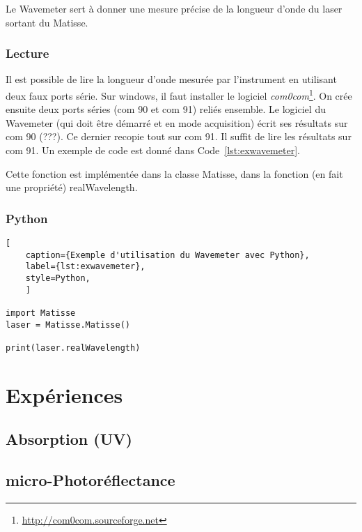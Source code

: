 \documentclass[11pt,francais]{book} %
\begin{document}
Le Wavemeter sert à donner une mesure précise de la longueur d'onde du laser sortant du Matisse.

\subsection{Lecture}
Il est possible de lire la longueur d'onde mesurée par l'instrument en utilisant deux faux ports série.
Sur windows, il faut installer le logiciel {\it com0com}\footnote{\url{http://com0com.sourceforge.net}}.
On crée ensuite deux ports séries (com 90 et com 91) reliés ensemble.
Le logiciel du Wavemeter (qui doit être démarré et en mode acquisition) écrit ses résultats sur com 90 (???).
Ce dernier recopie tout sur com 91.
Il suffit de lire les résultats sur com 91.
Un exemple de code est donné dans Code~\ref{lst:exwavemeter}.

Cette fonction est implémentée dans la classe Matisse, dans la fonction (en fait une propriété) realWavelength.

\subsection{Python}

\begin{lstlisting}[
    caption={Exemple d'utilisation du Wavemeter avec Python},
    label={lst:exwavemeter},
    style=Python,
    ]  

import Matisse
laser = Matisse.Matisse()

print(laser.realWavelength)
\end{lstlisting}




\chapter{Expériences}

\section{Absorption (UV)}

\section{micro-Photoréflectance}
\end{document}
